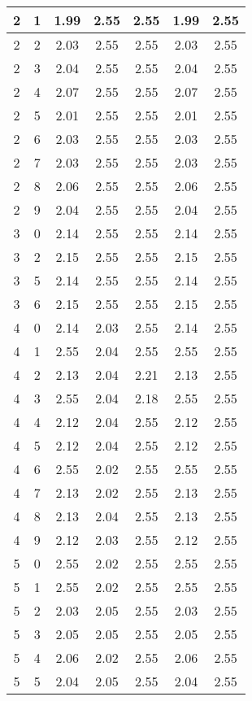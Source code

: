 \begin{longtable}{|c|c||c||c|c||c|c|}
	2 & 1 & 1.99 & 2.55 & 2.55 & 1.99 & 2.55 \\ \hline
	2 & 2 & 2.03 & 2.55 & 2.55 & 2.03 & 2.55 \\ \hline
	2 & 3 & 2.04 & 2.55 & 2.55 & 2.04 & 2.55 \\ \hline
	2 & 4 & 2.07 & 2.55 & 2.55 & 2.07 & 2.55 \\ \hline
	2 & 5 & 2.01 & 2.55 & 2.55 & 2.01 & 2.55 \\ \hline
	2 & 6 & 2.03 & 2.55 & 2.55 & 2.03 & 2.55 \\ \hline
	2 & 7 & 2.03 & 2.55 & 2.55 & 2.03 & 2.55 \\ \hline
	2 & 8 & 2.06 & 2.55 & 2.55 & 2.06 & 2.55 \\ \hline
	2 & 9 & 2.04 & 2.55 & 2.55 & 2.04 & 2.55 \\ \hline
	3 & 0 & 2.14 & 2.55 & 2.55 & 2.14 & 2.55 \\ \hline
	3 & 2 & 2.15 & 2.55 & 2.55 & 2.15 & 2.55 \\ \hline
	3 & 5 & 2.14 & 2.55 & 2.55 & 2.14 & 2.55 \\ \hline
	3 & 6 & 2.15 & 2.55 & 2.55 & 2.15 & 2.55 \\ \hline
	4 & 0 & 2.14 & 2.03 & 2.55 & 2.14 & 2.55 \\ \hline
	4 & 1 & 2.55 & 2.04 & 2.55 & 2.55 & 2.55 \\ \hline
	4 & 2 & 2.13 & 2.04 & 2.21 & 2.13 & 2.55 \\ \hline
	4 & 3 & 2.55 & 2.04 & 2.18 & 2.55 & 2.55 \\ \hline
	4 & 4 & 2.12 & 2.04 & 2.55 & 2.12 & 2.55 \\ \hline
	4 & 5 & 2.12 & 2.04 & 2.55 & 2.12 & 2.55 \\ \hline
	4 & 6 & 2.55 & 2.02 & 2.55 & 2.55 & 2.55 \\ \hline
	4 & 7 & 2.13 & 2.02 & 2.55 & 2.13 & 2.55 \\ \hline
	4 & 8 & 2.13 & 2.04 & 2.55 & 2.13 & 2.55 \\ \hline
	4 & 9 & 2.12 & 2.03 & 2.55 & 2.12 & 2.55 \\ \hline
	5 & 0 & 2.55 & 2.02 & 2.55 & 2.55 & 2.55 \\ \hline
	5 & 1 & 2.55 & 2.02 & 2.55 & 2.55 & 2.55 \\ \hline
	5 & 2 & 2.03 & 2.05 & 2.55 & 2.03 & 2.55 \\ \hline
	5 & 3 & 2.05 & 2.05 & 2.55 & 2.05 & 2.55 \\ \hline
	5 & 4 & 2.06 & 2.02 & 2.55 & 2.06 & 2.55 \\ \hline
	5 & 5 & 2.04 & 2.05 & 2.55 & 2.04 & 2.55 \\ \hline

\end{longtable}

